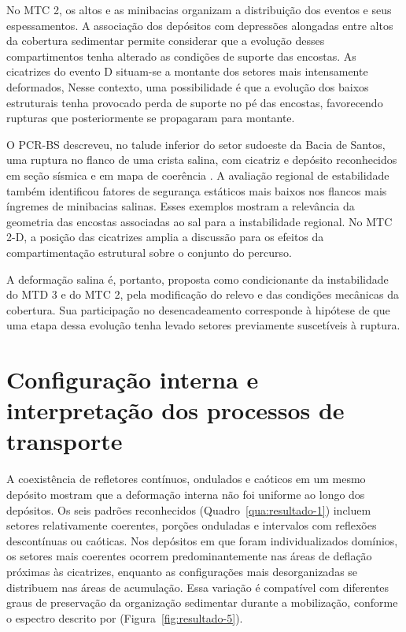 No MTC 2, os altos e as minibacias organizam a distribuição dos eventos e seus espessamentos. A associação dos depósitos com depressões alongadas entre altos da cobertura sedimentar permite considerar que a evolução desses compartimentos tenha alterado as condições de suporte das encostas. As cicatrizes do evento D situam-se a montante dos setores mais intensamente deformados, Nesse contexto, uma possibilidade é que a evolução dos baixos estruturais tenha provocado perda de suporte no pé das encostas, favorecendo rupturas que posteriormente se propagaram para montante.

O PCR-BS descreveu, no talude inferior do setor sudoeste da Bacia de Santos, uma ruptura no flanco de uma crista salina, com cicatriz e depósito reconhecidos em seção sísmica e em mapa de coerência \cite{petrobras2022}. A avaliação regional de estabilidade também identificou fatores de segurança estáticos mais baixos nos flancos mais íngremes de minibacias salinas. Esses exemplos mostram a relevância da geometria das encostas associadas ao sal para a instabilidade regional. No MTC 2-D, a posição das cicatrizes amplia a discussão para os efeitos da compartimentação estrutural sobre o conjunto do percurso.

A deformação salina é, portanto, proposta como condicionante da instabilidade do MTD 3 e do MTC 2, pela modificação do relevo e das condições mecânicas da cobertura. Sua participação no desencadeamento corresponde à hipótese de que uma etapa dessa evolução tenha levado setores previamente suscetíveis à ruptura.

\section{Configuração interna e interpretação dos processos de transporte}\label{sec:6-3}

A coexistência de refletores contínuos, ondulados e caóticos em um mesmo depósito mostram que a deformação interna não foi uniforme ao longo dos depósitos. Os seis padrões reconhecidos (Quadro~\ref{qua:resultado-1}) incluem setores relativamente coerentes, porções onduladas e intervalos com reflexões descontínuas ou caóticas. Nos depósitos em que foram individualizados domínios, os setores mais coerentes ocorrem predominantemente nas áreas de deflação próximas às cicatrizes, enquanto as configurações mais desorganizadas se distribuem nas áreas de acumulação. Essa variação é compatível com diferentes graus de preservação da organização sedimentar durante a mobilização, conforme o espectro descrito por  (Figura~\ref{fig:resultado-5}).

